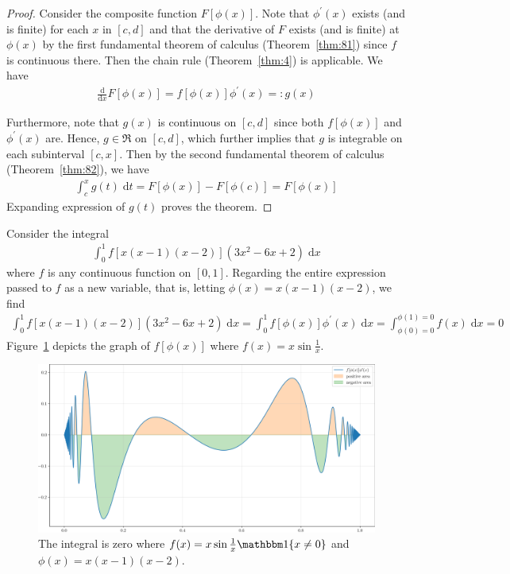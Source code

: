 \documentclass[thmcnt=section, 12pt]{my-elegantbook}
\begin{document}
\begin{proof}
	Consider the composite function $F[\phi(x)]$.
	Note that $\phi^\prime(x)$ exists (and is finite) 
	for each $x$ in $[c,d]$ 
	and that the derivative of $F$ exists (and is finite) 
	at $\phi(x)$
	by the first fundamental theorem of calculus (Theorem~\ref{thm:81})
	since $f$ is continuous there.
	Then the chain rule (Theorem~\ref{thm:4}) is applicable.
	We have 
	\begin{align*}
		\frac{ \mathrm{d} }{ \mathrm{d} x } F[\phi(x)]
		= f[ \phi(x) ] \phi^\prime(x)
		=: g(x)
	\end{align*}
	
	Furthermore, note that $g(x)$ is continuous on $[c, d]$
	since both $f[\phi(x)]$ and $\phi^\prime(x)$ are.
	Hence, $g \in \mathfrak{R}$ on $[c, d]$, 
	which further implies that $g$ is integrable 
	on each subinterval $[c, x]$.
	Then by the second fundamental theorem of calculus 
	(Theorem~\ref{thm:82}),
	we have 
	\begin{align*}
		\int_c^x g(t) \; \mathrm{d} t
		= F[\phi(x)] - F[\phi(c)]
		= F[\phi(x)]
	\end{align*}
	Expanding expression of $g(t)$ proves the theorem.
\end{proof}

\begin{example} \label{eg:14}
	Consider the integral
	\begin{align*}
		\int_0^1 f[x(x-1)(x-2)](3x^2 - 6x + 2) \; \mathrm{d} x
	\end{align*}
	where $f$ is any continuous function on $[0, 1]$.
	Regarding the entire expression passed to $f$ as a new variable, 
	that is, letting $\phi(x) = x(x-1)(x-2)$,
	we find 
	\begin{align*}
		\int_0^1 f[x(x-1)(x-2)](3x^2 - 6x + 2) \; \mathrm{d} x
		= \int_0^1 f[\phi(x)]\phi^\prime(x) \; \mathrm{d} x
		= \int_{\phi(0) = 0}^{\phi(1) = 0}
		f(x) \; \mathrm{d} x 
		= 0
	\end{align*}
	Figure~\ref{fig:17} depicts the graph of $f[\phi(x)]$
	where $f(x) = x \sin\frac{1}{x}$.

	\begin{figure}[ht]
		\centering
		\includegraphics[scale=0.5]{figures/ma-017.png}
		\caption{The integral is zero where $f(x) = x \sin\frac{1}{x} \ind\{x \neq 0\}$ and $\phi(x) = x(x-1)(x-2)$.}
		\label{fig:17}
	\end{figure}
\end{example}
\end{document}
